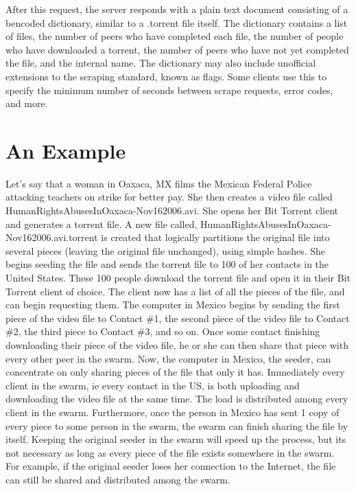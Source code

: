 \documentclass[a4paper,12pt]{report}
\begin{document}
After this request, the server responds with a plain text document consisting of a bencoded dictionary, similar to a .torrent file itself. The dictionary contains a list of files, the number of peers who have completed each file, the number of people who have downloaded a torrent, the number of peers who have not yet completed the file, and the internal name. The dictionary may also include unofficial extensions to the scraping standard, known as flags. Some clients use this to specify the minimum number of seconds between scrape requests, error codes, and more.

\section{An Example}
Let's say that a woman in Oaxaca, MX films the Mexican Federal Police attacking teachers on strike for better pay.
She then creates a video file called HumanRightsAbusesInOaxaca-Nov162006.avi. She opens her Bit Torrent client and generates a torrent file.
A new file called, HumanRightsAbusesInOaxaca-Nov162006.avi.torrent is created that logically partitions the original file into several pieces (leaving the original file unchanged), using simple hashes.
She begins seeding the file and sends the torrent file to 100 of her contacts in the United States.
These 100 people download the torrent file and open it in their Bit Torrent client of choice.
The client now has a list of all the pieces of the file, and can begin requesting them.
The computer in Mexico begins by sending the first piece of the video file to Contact \#1, the second piece of the video file to Contact \#2, the third piece to Contact \#3, and so on.
Once some contact finishing downloading their piece of the video file, he or she can then share that piece with every other peer in the swarm.
Now, the computer in Mexico, the seeder, can concentrate on only sharing pieces of the file that only it has.
Immediately every client in the swarm, ie every contact in the US, is both uploading and downloading the video file at the same time.
The load is distributed among every client in the swarm.
Furthermore, once the person in Mexico has sent 1 copy of every piece to some person in the swarm, the swarm can finish sharing the file by itself.
Keeping the original seeder in the swarm will speed up the process, but its not necessary as long as every piece of the file exists somewhere in the swarm.
For example, if the original seeder loses her connection to the Internet, the file can still be shared and distributed among the swarm.
\end{document}
